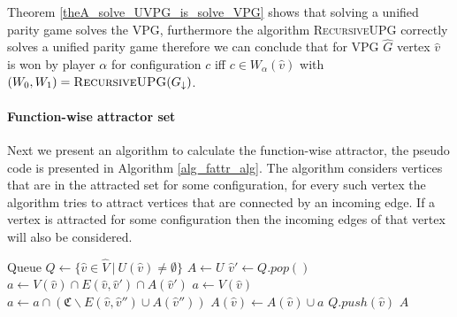 Theorem \ref{theA_solve_UVPG_is_solve_VPG} shows that solving a unified parity game solves the VPG, furthermore the algorithm \textsc{RecursiveUPG} correctly solves a unified parity game therefore we can conclude that for VPG $\hat{G}$ vertex $\hat{v}$ is won by player $\alpha$ for configuration $c$ iff $c \in W_\alpha(\hat{v})$ with $(W_0,W_1) = \textsc{RecursiveUPG}(G_{\downarrow})$.

\paragraph{Function-wise attractor set}
Next we present an algorithm to calculate the function-wise attractor, the pseudo code is presented in Algorithm \ref{alg_fattr_alg}. The algorithm considers vertices that are in the attracted set for some configuration, for every such vertex the algorithm tries to attract vertices that are connected by an incoming edge. If a vertex is attracted for some configuration then the incoming edges of that vertex will also be considered.
\begin{algorithm}
	\caption{$\textsc{$\alpha$-FAttractor}(G, U : \hat{V} \rightarrow 2^\mathfrak{C})$}\label{alg_fattr_alg}
	\begin{algorithmic}[1]
		\State Queue $Q \gets \{\hat{v} \in \hat{V} \ |\ U(\hat{v}) \neq \emptyset  \}$
		\State $A \gets U$
		\State $\hat{v}' \gets Q.pop()$
				\State $a \gets V(\hat{v}) \cap E(\hat{v},\hat{v}') \cap A(\hat{v}')$
			\Else
				\State $a \gets V(\hat{v})$
					\State $a \gets a \cap (\mathfrak{C}\backslash E(\hat{v},\hat{v}'') \cup A(\hat{v}''))$
				\EndFor
			\EndIf
				\State $A(\hat{v}) \gets A(\hat{v}) \cup a$
				\State $Q.push(\hat{v})$
			\EndIf
		\EndFor
		\EndWhile
		\State \Return $A$
	\end{algorithmic}
\end{algorithm}

